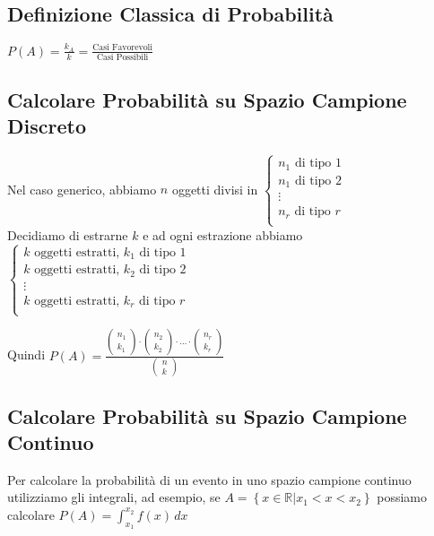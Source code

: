 \documentclass{article}
\begin{document}
\subsection{Definizione Classica di Probabilità}
$P(A) = \frac{k_A}{k} = \frac{\text{Casi Favorevoli}}{\text{Casi Possibili}}$

\subsection{Calcolare Probabilità su Spazio Campione Discreto}
Nel caso generico, abbiamo $n$ oggetti divisi in $\begin{cases}
n_1 \text{ di tipo } 1 \\
n_1 \text{ di tipo } 2 \\
\vdots \\
n_r \text{ di tipo } r \\
\end{cases}$ \\

Decidiamo di estrarne $k$ e ad ogni estrazione abbiamo $\begin{cases}
k \text{ oggetti estratti, }k_1 \text{ di tipo } 1 \\
k \text{ oggetti estratti, }k_2 \text{ di tipo } 2 \\
\vdots \\
k \text{ oggetti estratti, }k_r \text{ di tipo } r \\
\end{cases}$

Quindi $P(A) = \frac{\left(\begin{matrix} n_1 \\ k_1\end{matrix}\right) \cdot \left(\begin{matrix} n_2 \\ k_2\end{matrix}\right) \cdot \dots \cdot \left(\begin{matrix} n_r \\ k_r\end{matrix}\right)} {\left(\begin{matrix} n \\ k\end{matrix}\right)}$

\subsection{Calcolare Probabilità su Spazio Campione Continuo}
Per calcolare la probabilità di un evento in uno spazio campione continuo utilizziamo gli integrali, ad esempio, se $A = \left\{ x \in \mathbb{R} | x_1 < x < x_2 \right\}$ possiamo calcolare $P(A) = \int_{x_1}^{x_2} f(x) \,dx $
\end{document}
